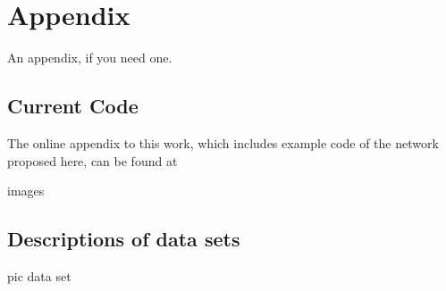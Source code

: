 \chapter{Appendix}\label{ch:data}
An appendix, if you need one.

\section{Current Code}
The online appendix to this work, which includes example code of the network
proposed here, can be found at 

images

\section{Descriptions of data sets}

pic data set